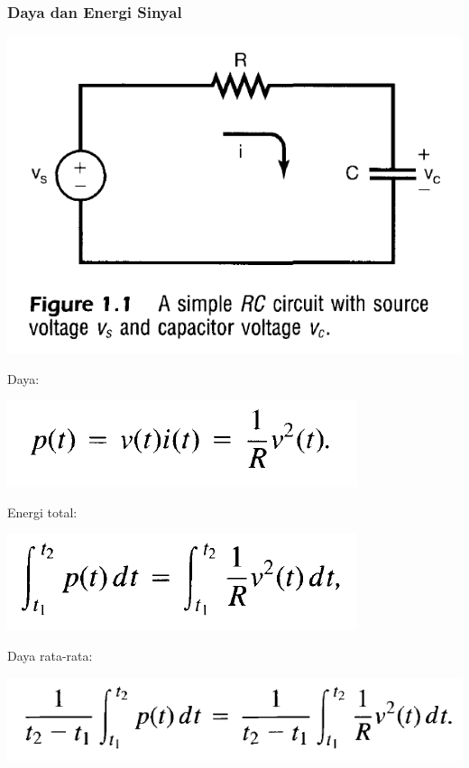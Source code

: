 \documentclass[pdflatex,compress,mathserif]{beamer}
\begin{document}
\begin{frame}
	\frametitle{Daya dan Energi Sinyal}
	\begin{multicols}{2}
		\begin{center}
			\includegraphics[width=\linewidth]{img/img01}
		\end{center}
		\columnbreak
		Daya:\\
		\begin{center}
			\includegraphics[width=0.7\linewidth]{img/img08}
		\end{center}
		Energi total:\\
		\begin{center}
			\includegraphics[width=0.7\linewidth]{img/img09}
		\end{center}
		Daya rata-rata:\\
		\begin{center}
			\includegraphics[width=\linewidth]{img/img10}
		\end{center}
	\end{multicols}
\end{frame}
\end{document}

